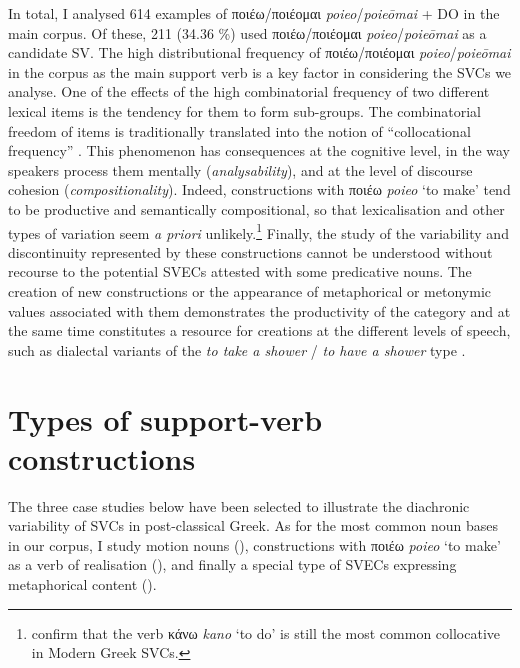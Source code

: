 \documentclass[output=paper,colorlinks,citecolor=brown]{langscibook}
\begin{document}
In total, I analysed 614 examples of ποιέω/ποιέομαι \emph{poieo}/\emph{poieōmai} + DO in
the main corpus. Of these, 211 (34.36 \%) used ποιέω/ποιέομαι \emph{poieo}/\emph{poieōmai}
as a candidate SV. 
The high distributional frequency of ποιέω/ποιέομαι \emph{poieo}/\emph{poieōmai} in the corpus as the main support verb is a key factor in considering the SVCs we analyse.
One of the effects of the high combinatorial frequency of two different lexical
items is the tendency for them to form sub-groups. The combinatorial freedom of items is
traditionally translated into the notion of ``collocational frequency''
\parencite{FendelVictoria-202382}. This phenomenon has consequences at the cognitive
level, in the way speakers process them mentally (\emph{analysability}), and at the level
of discourse cohesion (\emph{compositionality}). Indeed, constructions with ποιέω
\emph{poieo} `to make' tend to be productive and semantically compositional, so that
lexicalisation and other types of variation seem \textit{a priori}
unlikely.\footnote{\citet{KyriasoupoulouTitaandSfetsiouVasso-2003241} confirm that the verb
  κάνω \emph{kano} `to do' is still the most common collocative in Modern Greek SVCs.}
\largerpage
Finally, the study of the variability and discontinuity represented by these constructions
cannot be understood without recourse to the potential SVECs attested with some
predicative nouns. The creation of new constructions or the appearance of metaphorical or
metonymic values associated with them demonstrates the productivity of the category and at
the same time constitutes a resource for creations at the different levels of speech, such
as dialectal variants of the \emph{to take a shower} / \emph{to have a shower} type
\parencite{OzbayAliSukru-2020683}.

\section{Types of support-verb constructions}\label{sec:vc:5}

The three case studies below have been selected to illustrate the diachronic variability
of SVCs in post-classical Greek. As for the most common noun bases in our corpus, I study
motion nouns (), constructions with ποιέω \emph{poieo} `to make'
as a verb of realisation (), and finally a special type of SVECs
expressing metaphorical content ().
\end{document}
